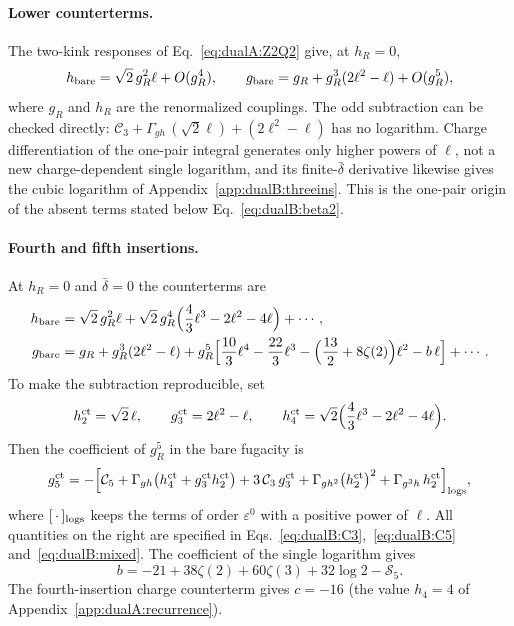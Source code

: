 \documentclass[11pt,a4paper]{article}
\numberwithin{equation}{section}
\newcommand{\db}{\bar\delta}
\begin{document}
\paragraph{Lower counterterms.} The two-kink responses of Eq.~\eqref{eq:dualA:Z2Q2} give, at $h_R=0$,
\begin{equation}
 h_{\rm bare}=\sqrt2\,g_R^2\ell+O(g_R^4),\qquad g_{\rm bare}=g_R+g_R^3(2\ell^2-\ell)+O(g_R^5),
 \label{eq:dualB:lowerct}
\end{equation}
where $g_R$ and $h_R$ are the renormalized couplings. The odd subtraction can be checked directly:
$\mathcal C_3+\Gamma_{gh}\,(\sqrt2\ell)+(2\ell^2-\ell)$ has no logarithm. Charge differentiation of the one-pair
integral generates only higher powers of $\ell$, not a new charge-dependent single logarithm, and its finite-$\db$
derivative likewise gives the cubic logarithm of Appendix~\ref{app:dualB:threeins}. This is the one-pair origin of the
absent terms stated below Eq.~\eqref{eq:dualB:beta2}.

\paragraph{Fourth and fifth insertions.} At $h_R=0$ and $\db=0$ the counterterms are
\begin{equation}
\begin{aligned}
 h_{\rm bare}={}&\sqrt2\,g_R^2\ell+\sqrt2\,g_R^4\Bigl(\frac43\ell^3-2\ell^2-4\ell\Bigr)+\cdots,\\
 g_{\rm bare}={}&g_R+g_R^3(2\ell^2-\ell)
 +g_R^5\Bigl[\frac{10}{3}\ell^4-\frac{22}{3}\ell^3-\Bigl(\frac{13}{2}+8\zeta(2)\Bigr)\ell^2-b\,\ell\Bigr]+\cdots.
\end{aligned}
\label{eq:dualB:g5ct}
\end{equation}
To make the subtraction reproducible, set
\begin{equation}
 h^{\rm ct}_2=\sqrt2\,\ell,\qquad g^{\rm ct}_3=2\ell^2-\ell,\qquad
 h^{\rm ct}_4=\sqrt2\Bigl(\frac43\ell^3-2\ell^2-4\ell\Bigr).
\end{equation}
Then the coefficient of $g_R^5$ in the bare fugacity is
\begin{equation}
 g^{\rm ct}_5=-\Bigl[\mathcal C_5+\Gamma_{gh}\bigl(h^{\rm ct}_4+g^{\rm ct}_3h^{\rm ct}_2\bigr)+3\,\mathcal C_3\,g^{\rm ct}_3
 +\Gamma_{gh^2}\bigl(h^{\rm ct}_2\bigr)^2+\Gamma_{g^3h}\,h^{\rm ct}_2\Bigr]_{\rm logs},
 \label{eq:dualB:g5assembly}
\end{equation}
where $[\,\cdot\,]_{\rm logs}$ keeps the terms of order $\varepsilon^0$ with a positive power of $\ell$. All quantities
on the right are specified in Eqs.~\eqref{eq:dualB:C3},~\eqref{eq:dualB:C5} and~\eqref{eq:dualB:mixed}. The
coefficient of the single logarithm gives
\begin{equation}
 b=-21+38\zeta(2)+60\zeta(3)+32\log2-\mathcal S_5.
 \label{eq:dualB:bperiod}
\end{equation}
The fourth-insertion charge counterterm gives $c=-16$ (the value $h_4=4$ of Appendix~\ref{app:dualA:recurrence}).
\end{document}
